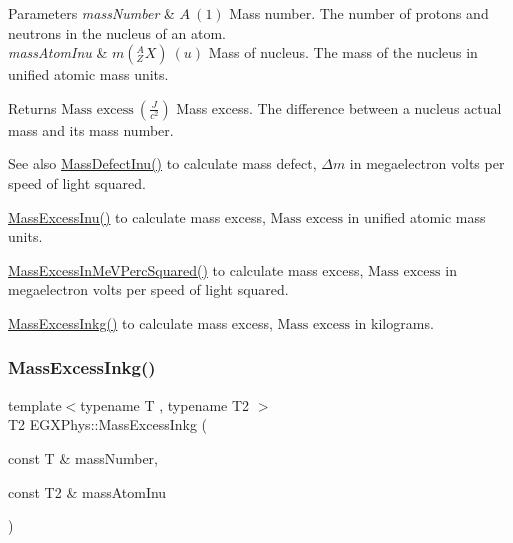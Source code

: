 \begin{DoxyParams}{Parameters}
{\em mass\+Number} & $A\ (1)$ Mass number. The number of protons and neutrons in the nucleus of an atom. \\
\hline
{\em mass\+Atom\+Inu} & $m({^A_ZX})\ (u)$ Mass of nucleus. The mass of the nucleus in unified atomic mass units. \\
\hline
\end{DoxyParams}
\begin{DoxyReturn}{Returns}
$\text{Mass excess}\ (\frac{J}{c^2})$ Mass excess. The difference between a nucleus actual mass and its mass number. 
\end{DoxyReturn}
\begin{DoxySeeAlso}{See also}
\mbox{\hyperlink{group___e_g_x_phys-_mass_defect_ga70400004a5cb622de372ab84670731ef}{Mass\+Defect\+Inu()}} to calculate mass defect, $\Delta m$ in megaelectron volts per speed of light squared. 

\mbox{\hyperlink{group___e_g_x_phys-_mass_excess_ga61c6f557bd742126c0c76e88cf7740ad}{Mass\+Excess\+Inu()}} to calculate mass excess, $\text{Mass excess}$ in unified atomic mass units. 

\mbox{\hyperlink{group___e_g_x_phys-_mass_excess_ga99a93b88df3425b7a153c32c05fa5a88}{Mass\+Excess\+In\+Me\+V\+Perc\+Squared()}} to calculate mass excess, $\text{Mass excess}$ in megaelectron volts per speed of light squared. 

\mbox{\hyperlink{group___e_g_x_phys-_mass_excess_gab72a3640886092be8b9c9662020a2306}{Mass\+Excess\+Inkg()}} to calculate mass excess, $\text{Mass excess}$ in kilograms. 
\end{DoxySeeAlso}
\mbox{\label{group___e_g_x_phys-_mass_excess_gab72a3640886092be8b9c9662020a2306}} 
\subsubsection{\texorpdfstring{Mass\+Excess\+Inkg()}{MassExcessInkg()}}
{\footnotesize\ttfamily template$<$typename T , typename T2 $>$ \\
T2 E\+G\+X\+Phys\+::\+Mass\+Excess\+Inkg (\begin{DoxyParamCaption}\item[{const T \&}]{mass\+Number,  }\item[{const T2 \&}]{mass\+Atom\+Inu }\end{DoxyParamCaption})}



